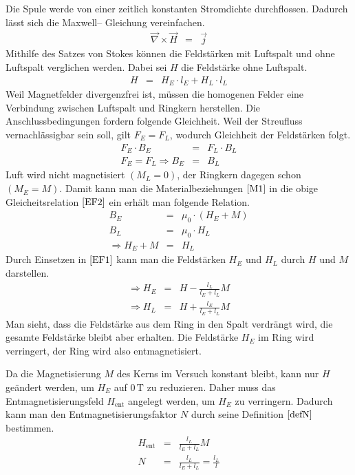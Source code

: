 \documentclass[12pt,a4paper]{scrartcl}
\numberwithin{equation}{section} %
\begin{document}
Die Spule werde von einer zeitlich konstanten Stromdichte durchflossen. Dadurch lässt sich die Maxwell-- Gleichung vereinfachen.
\begin{eqnarray}
    \vec \nabla \times \vec H &=& \vec j
\end{eqnarray}
Mithilfe des Satzes von Stokes können die Feldstärken mit Luftspalt und ohne Luftspalt verglichen werden. Dabei sei $H$ die Feldstärke ohne Luftspalt.
\begin{eqnarray}
    H &=& H_E\cdot l_E + H_L \cdot l_L \label{EF1}
\end{eqnarray}
Weil Magnetfelder divergenzfrei ist, müssen die homogenen Felder eine Verbindung zwischen Luftspalt und Ringkern herstellen. Die Anschlussbedingungen fordern folgende Gleichheit. Weil der Streufluss vernachlässigbar sein soll, gilt $F_E = F_L$, wodurch Gleichheit der Feldstärken folgt.
\begin{eqnarray}
    F_E\cdot B_E &=& F_L\cdot B_L \nonumber \\
    F_E = F_L \Rightarrow B_E &=& B_L \label{EF2}
\end{eqnarray}
Luft wird nicht magnetisiert $(M_L=0)$, der Ringkern dagegen schon $(M_E=M)$. Damit kann man die Materialbeziehungen $\eqref{M1}$ in die obige Gleicheitsrelation $\eqref{EF2}$ ein erhält man folgende Relation.
\begin{eqnarray}
    B_E &=& \mu_0 \cdot \left(H_E + M\right) \nonumber \\
    B_L &=& \mu_0 \cdot H_L \nonumber \\
    \Rightarrow H_E + M &=& H_L \label{EF3}
\end{eqnarray}
Durch Einsetzen in $\eqref{EF1}$ kann man die Feldstärken $H_E$ und $H_L$ durch $H$ und $M$ darstellen.
\begin{eqnarray}
    \Rightarrow H_E &=& H - \frac{l_L}{l_E+l_L} M \\
    \Rightarrow H_L &=& H + \frac{l_E}{l_E+l_L} M
\end{eqnarray}
Man sieht, dass die Feldstärke aus dem Ring in den Spalt verdrängt wird, die gesamte Feldstärke bleibt aber erhalten. Die Feldstärke $H_E$ im Ring wird verringert, der Ring wird also entmagnetisiert.

Da die Magnetisierung $M$ des Kerns im Versuch konstant bleibt, kann nur $H$ geändert werden, um $H_E$ auf $0\mathrm{\,T}$ zu reduzieren. Daher muss das Entmagnetisierungsfeld $H_\mathrm{ent}$ angelegt
werden, um $H_E$ zu verringern. Dadurch kann man den Entmagnetisierungsfaktor $N$ durch seine Definition $\eqref{defN}$ bestimmen.
\begin{eqnarray}
    H_\mathrm{ent} &=& \frac{l_L}{l_E+l_L} M \\
    N &=& \frac{l_L}{l_E+l_L} = \frac{l_L}{l}
\end{eqnarray}
\end{document}
